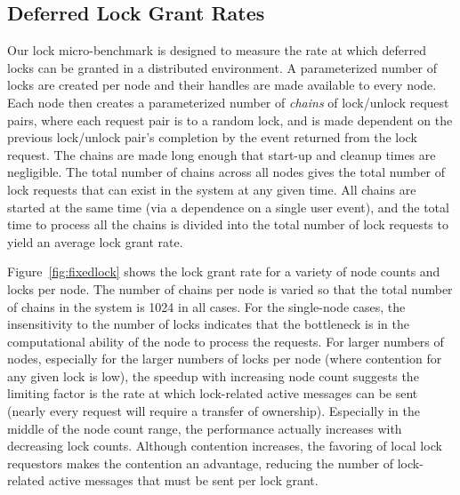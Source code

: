 \subsection{Deferred Lock Grant Rates}
\label{subsec:lockmicro}

Our lock micro-benchmark is designed to measure the rate at which deferred locks can be granted
in a distributed environment.
A parameterized number of locks are created per node and their handles are made available to
every node.  Each node then creates a parameterized number of {\em chains} of lock/unlock
request pairs, where each request pair is to a random lock, and is made dependent on the 
previous lock/unlock pair's completion by the event returned from the lock request.  
The chains are made long enough that start-up
and cleanup times are negligible.  The total number of chains across all nodes gives the total
number of lock requests that can exist in the system at any given time.  All chains are
started at the same time (via a dependence on a single user event), and the total time to
process all the chains is divided into the total number of lock requests to yield an average
lock grant rate.


Figure~\ref{fig:fixedlock} shows the lock grant rate for a variety of node counts and locks
per node.  The number of chains per node is varied so that the total number of chains in the system
is 1024 in all cases.  For the single-node cases, the insensitivity to the number of locks indicates
that the bottleneck is in the computational ability of the node to process the requests. 
For larger numbers of nodes, especially for the larger numbers of locks per node (where contention
for any given lock is low), the speedup with increasing node count suggests the limiting factor is
the rate at which lock-related active messages can be sent (nearly every request will require a
transfer of ownership).  Especially in the middle of the node count range, the performance actually
increases with
decreasing lock counts.  Although contention increases, the favoring of local lock requestors makes
the contention an advantage, reducing the number of lock-related active messages that must be sent
per lock grant.

